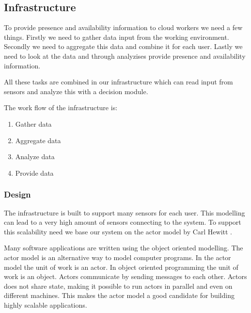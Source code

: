 \documentclass{sigchi}
\begin{document}

\subsection{Infrastructure}
To provide presence and availability information to cloud workers we need a few things.
Firstly we need to gather data input from the working environment.
Secondly we need to aggregate this data and combine it for each user.
Lastly we need to look at the data and through analyzises provide presence and availability information.

All these tasks are combined in our infrastructure which can read input from sensors and analyze this with a decision module.

The work flow of the infrastructure is:
\begin{enumerate}
  \item Gather data
  \item Aggregate data
  \item Analyze data
  \item Provide data
\end{enumerate}

\subsubsection{Design}
The infrastructure is built to support many sensors for each user.
This modelling can lead to a very high amount of sensors connecting to the system.
To support this scalability need we base our system on the actor model by Carl Hewitt \cite{hewitt1973universal}.

Many software applications are written using the object oriented modelling.
The actor model is an alternative way to model computer programs.
In the actor model the unit of work is an actor.
In object oriented programming the unit of work is an object.
Actors communicate by sending messages to each other.
Actors does not share state, making it possible to run actors in parallel and even on different machines.
This makes the actor model a good candidate for building highly scalable applications.
\end{document}

